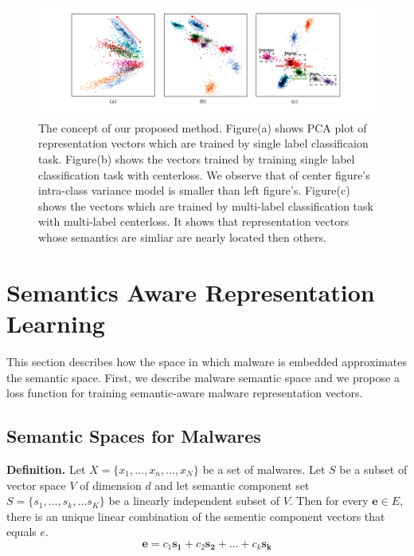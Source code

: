 \begin{figure}[!htb] %
  \includegraphics[width=\textwidth]{../../figures/concept_fix.pdf}
  \caption{The concept of our proposed method. Figure(a) shows PCA plot of representation vectors which are trained by single label classificaion task. Figure(b) shows the vectors trained by training single label classification task with centerloss. We observe that of center figure's intra-class variance model is smaller than left figure's.
  Figure(c) shows the vectors which are trained by multi-label classification task with multi-label centerloss. It shows that representation vectors whose semantics are simliar are nearly located then others. 
%  
  }
  \label{fig:concept}
\end{figure}

\section{Semantics Aware Representation Learning}
This section describes how the space in which malware is embedded approximates the semantic space. First, we describe malware semantic space and we propose a loss function for training semantic-aware malware representation vectors.

\subsection{Semantic Spaces for Malwares}

\textbf{Definition. }
Let $X = \{x_1, …, x_n, …, x_N\}$ be a set of malwares.
Let $S$ be a subset of vector space $V$ of dimension $d$ and let semantic component set $S = \{s_1, ... , s_k, … s_K\}$ be a linearly independent subset of $V$.  
Then for every $\mathbf{e} \in E$, there is an unique linear combination of the sementic component vectors that equals $e$.
\[
\mathbf{e} = c_1\mathbf{s_1} + c_2\mathbf{s_2} + … + c_k\mathbf{s_k} 
\]

